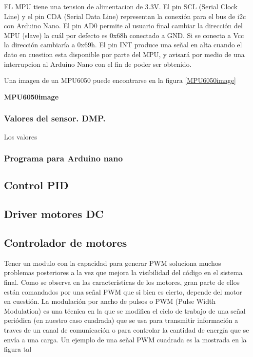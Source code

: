 EL MPU tiene una tension de alimentacion de 3.3V. El pin SCL (Serial Clock Line) y el pin CDA (Serial Data Line) representan la conexión para el bus de i2c con Arduino Nano. El pin AD0 permite al usuario final cambiar la dirección del MPU (slave) la cuál por defecto es 0x68h conectado a GND. Si se conecta a Vcc la dirección cambiaría a 0x69h. El pin INT produce una señal en alta cuando el dato en cuestion esta disponible por parte del MPU, y avisará por medio de una interrupcion al Arduino Nano con el fin de poder ser obtenido. \newline

Una imagen de un MPU6050 puede encontrarse en la figura \ref{MPU6050image}

\textbf{MPU6050image}

\subsubsection{Valores del sensor. DMP. }

Los valores 

\subsubsection{Programa para Arduino nano}



\subsection{Control PID}
\subsection{Driver motores DC} \label{sec:driver_motores}

\subsection{Controlador de motores}
Tener un modulo con la capacidad para generar PWM soluciona muchos problemas posteriores a la vez que mejora la visibilidad del código en el sistema final. Como se observa en las características de los motores, gran parte de ellos están comandados por una señal PWM que si bien es cierto, depende del motor en cuestión. \newline
La modulación por ancho de pulsos o PWM (Pulse Width Modulation) es una técnica en la que se modifica el ciclo de trabajo de una señal periódica (en nuestro caso cuadrada) que se usa para transmitir información a traves de un canal de comunicación o para controlar la cantidad de energía que se envía a una carga. Un ejemplo de una señal PWM cuadrada es la mostrada en la figura tal 

